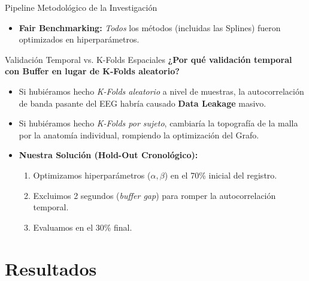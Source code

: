 \documentclass[10pt, aspectratio=169]{beamer}
\begin{document}
\begin{frame}{Pipeline Metodológico de la Investigación}
    \begin{itemize}
        \item \textbf{Fair Benchmarking:} \textit{Todos} los métodos (incluidas las Splines) fueron optimizados en hiperparámetros.
    \end{itemize}
\end{frame}

\begin{frame}{Validación Temporal vs. K-Folds Espaciales}
    \textbf{¿Por qué validación temporal con Buffer en lugar de K-Folds aleatorio?}
    \vspace{0.2cm}
    \begin{itemize}
        \item Si hubiéramos hecho \textit{K-Folds aleatorio} a nivel de muestras, la autocorrelación de banda pasante del EEG habría causado \textbf{Data Leakage} masivo.
        \item Si hubiéramos hecho \textit{K-Folds por sujeto}, cambiaría la topografía de la malla por la anatomía individual, rompiendo la optimización del Grafo.
        \item \textbf{Nuestra Solución (Hold-Out Cronológico):} 
        \begin{enumerate}
            \item Optimizamos hiperparámetros ($\alpha, \beta$) en el 70\% inicial del registro.
            \item Excluimos 2 segundos (\textit{buffer gap}) para romper la autocorrelación temporal.
            \item Evaluamos en el 30\% final.
        \end{enumerate}
    \end{itemize}
\end{frame}

\section{Resultados}
\end{document}
